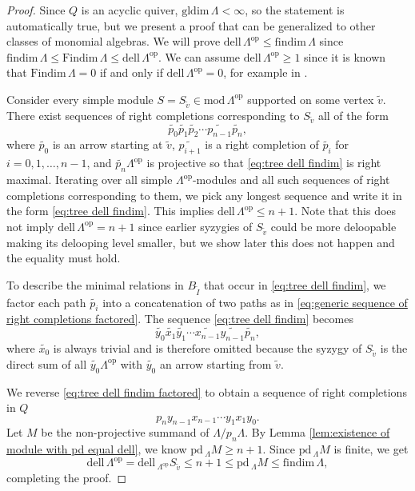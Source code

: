 \documentclass{conm-p-l}
\newcommand{\findim}{\mathrm{findim}\,}
\newcommand{\Findim}{\mathrm{Findim}\,}
\newcommand{\dell}{\mathrm{dell}\,}
\renewcommand{\dell}{\mathrm{dell}\,}
\newcommand{\pd}{\mathrm{pd}\,}
\newcommand{\gldim}{\mathrm{gldim}\,}
\newcommand{\op}{\mathrm{op}}
\renewcommand{\mod}{\mathrm{mod}\,}
\theoremstyle{definition}
\theoremstyle{remark}
\numberwithin{equation}{section}
\begin{document}
\begin{proof}
Since $Q$ is an acyclic quiver, $\gldim\Lambda<\infty$, so the statement is automatically true, but we present a proof that can be generalized to other classes of monomial algebras. We will prove $\dell\Lambda^{\op}\leq \findim\Lambda$ since $\findim\Lambda\leq \Findim\Lambda\leq \dell\Lambda^{\op}$. We can assume $\dell\Lambda^{\op}\geq 1$ since it is known that $\Findim\Lambda=0$ if and only if $\dell\Lambda^{\op}=0$, for example in \cite{krause2023symmetry}.

Consider every simple module $S=S_{\tilde{v}}\in\mod\Lambda^{\op}$ supported on some vertex $\tilde{v}$. There exist sequences of right completions corresponding to $S_{\tilde{v}}$ all of the form
\begin{equation}
\label{eq:tree dell findim}
\widetilde{p_0}\widetilde{p_1}\widetilde{p_2}\cdots \widetilde{p_{n-1}}\widetilde{p_n},
\end{equation}
where $\widetilde{p_0}$ is an arrow starting at $\tilde{v}$, $\widetilde{p_{i+1}}$ is a right completion of $\widetilde{p_i}$ for $i=0,1,\dots,n-1$, and $\widetilde{p_n}\Lambda^{\op}$ is projective so that \eqref{eq:tree dell findim} is right maximal. Iterating over all simple $\Lambda^{\op}$-modules and all such sequences of right completions corresponding to them, we pick any longest sequence and write it in the form \eqref{eq:tree dell findim}. This implies $\dell\Lambda^{\op}\leq n+1$. Note that this does not imply $\dell\Lambda^{\op}=n+1$ since earlier syzygies of $S_{\tilde{v}}$ could be more deloopable making its delooping level smaller, but we show later this does not happen and the equality must hold.

To describe the minimal relations in $B_{\tilde{I}}$ that occur in \eqref{eq:tree dell findim}, we factor each path $\widetilde{p_i}$ into a concatenation of two paths as in \eqref{eq:generic sequence of right completions factored}. The sequence \eqref{eq:tree dell findim} becomes
\begin{equation}
\label{eq:tree dell findim factored}
\widetilde{y_0}\widetilde{x_1}\widetilde{y_1}\cdots \widetilde{x_{n-1}}\widetilde{y_{n-1}} \widetilde{p_n},
\end{equation}
where $\widetilde{x_0}$ is always trivial and is therefore omitted because the syzygy of $S_{\tilde{v}}$ is the direct sum of all $\widetilde{y_0}\Lambda^{\op}$ with $\widetilde{y_0}$ an arrow starting from $\tilde{v}$.

We reverse \eqref{eq:tree dell findim factored} to obtain a sequence of right completions in $Q$
\begin{equation}
\label{eq:tree dell findim reversed}
p_n y_{n-1}x_{n-1}\cdots y_1x_1y_0.
\end{equation}
Let $M$ be the non-projective summand of $\Lambda/p_n\Lambda$. By Lemma \ref{lem:existence of module with pd equal dell}, we know $\pd\!_{\Lambda} M\geq n+1$. Since $\pd\!_{\Lambda} M$ is finite, we get
\[
\dell\Lambda^{\op} = \dell\!_{\Lambda^{\op}} S_{\tilde{v}} \leq n+1 \leq \pd\!_{\Lambda} M \leq \findim\Lambda,
\]
completing the proof.
\end{proof}
\end{document}

